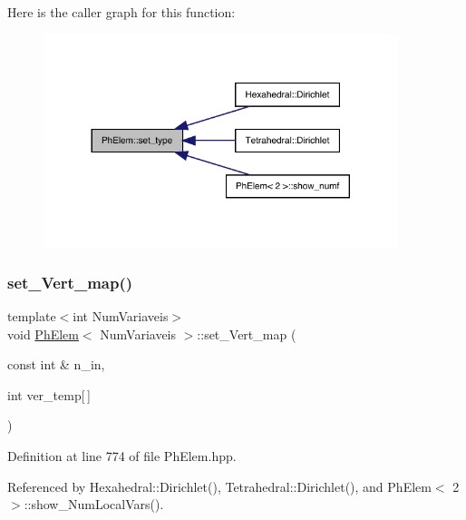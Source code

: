 Here is the caller graph for this function\+:
\nopagebreak
\begin{figure}[H]
\begin{center}
\leavevmode
\includegraphics[width=293pt]{classPhElem_ae226a41912e8e7c76be365518b2a38e2_icgraph}
\end{center}
\end{figure}
\mbox{\label{classPhElem_a134cbfd28fc238a24156ab1c24fc31c0}} 
\subsubsection{\texorpdfstring{set\+\_\+\+Vert\+\_\+map()}{set\_Vert\_map()}}
{\footnotesize\ttfamily template$<$int Num\+Variaveis$>$ \\
void \hyperlink{classPhElem}{Ph\+Elem}$<$ Num\+Variaveis $>$\+::set\+\_\+\+Vert\+\_\+map (\begin{DoxyParamCaption}\item[{const int \&}]{n\+\_\+in,  }\item[{int}]{ver\+\_\+temp\mbox{[}$\,$\mbox{]} }\end{DoxyParamCaption})}



Definition at line 774 of file Ph\+Elem.\+hpp.



Referenced by Hexahedral\+::\+Dirichlet(), Tetrahedral\+::\+Dirichlet(), and Ph\+Elem$<$ 2 $>$\+::show\+\_\+\+Num\+Local\+Vars().

